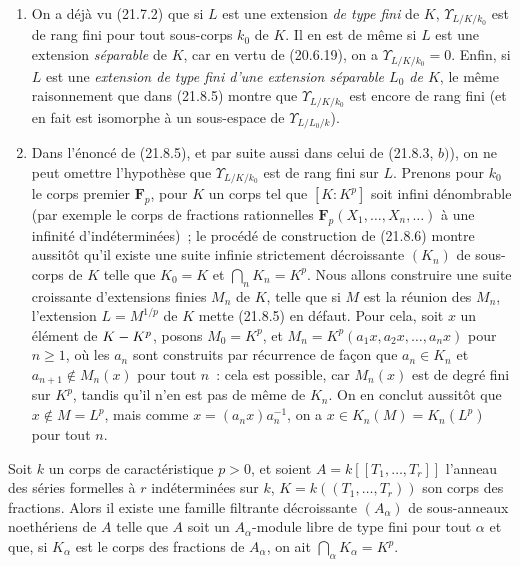 \begin{remarks}[21.8.7]
\label{0.21.8.7-fr}
\begin{enumerate}
  \item[(i)] On a déjà vu (21.7.2) que si $L$ est une extension
  \emph{de type fini} de $K$, $\Upsilon_{L/K/k_0}$ est de rang fini pour tout
  sous-corps $k_0$ de $K$. Il en est de même si $L$ est une extension
  \emph{séparable} de $K$, car en vertu de (20.6.19), on a
  $\Upsilon_{L/K/k_0}=0$. Enfin, si $L$ est une \emph{extension de type fini
  d'une extension séparable $L_0$ de $K$}, le même raisonnement que dans
  (21.8.5) montre que $\Upsilon_{L/K/k_0}$ est encore de rang fini (et en fait
  est isomorphe à un sous-espace de $\Upsilon_{L/L_0/k}$).

  \item[(ii)] Dans l'énoncé de (21.8.5), et par suite aussi dans celui de
  (21.8.3, $b)$), on ne peut omettre l'hypothèse que $\Upsilon_{L/K/k_0}$ est
  de rang fini sur $L$. Prenons pour $k_0$ le corps premier $\mathbf F_p$,
  pour $K$ un corps tel que $[K:K^p]$ soit infini dénombrable (par exemple le
  corps de fractions rationnelles $\mathbf F_p(X_1,\ldots,X_n,\ldots)$ à une
  infinité d'indéterminées)~; le procédé de construction de (21.8.6) montre
  aussitôt qu'il existe une suite infinie strictement décroissante $(K_n)$ de
  sous-corps de $K$ telle que $K_0=K$ et $\bigcap_nK_n=K^p$. Nous allons
  construire une suite croissante d'extensions finies $M_n$ de $K$, telle que
  si $M$ est la réunion des $M_n$, l'extension $L=M^{1/p}$ de $K$ mette
  (21.8.5) en défaut. Pour cela, soit $x$ un élément de $K- K^p$, posons
  $M_0=K^p$, et $M_n=K^p(a_1x,a_2x,\ldots,a_nx)$ pour $n\geqslant1$, où les
  $a_n$ sont construits par récurrence de façon que $a_n\in K_n$ et
  $a_{n+1}\notin M_n(x)$ pour tout $n$~: cela est possible, car $M_n(x)$ est
  de degré fini sur $K^p$, tandis qu'il n'en est pas de même de $K_n$. On en
  conclut aussitôt que $x\notin M=L^p$, mais comme
  $x=(a_nx)a_n^{-1}$, on a $x\in K_n(M)=K_n(L^p)$ pour tout $n$.
\end{enumerate}
\end{remarks}

\begin{proposition}[21.8.8]
\label{0.21.8.8-fr}
Soit $k$ un corps de caractéristique $p>0$, et soient
$A=k[[T_1,\ldots,T_r]]$ l'anneau des séries formelles à $r$ indéterminées sur
$k$, $K=k((T_1,\ldots,T_r))$ son corps des fractions. Alors il existe une
famille filtrante décroissante $(A_\alpha)$ de sous-anneaux noethériens de $A$
telle que $A$ soit un $A_\alpha$-module libre de type fini pour tout $\alpha$
et que, si $K_\alpha$ est le corps des fractions de $A_\alpha$, on ait
$\bigcap_\alpha K_\alpha=K^p$.
\end{proposition}


